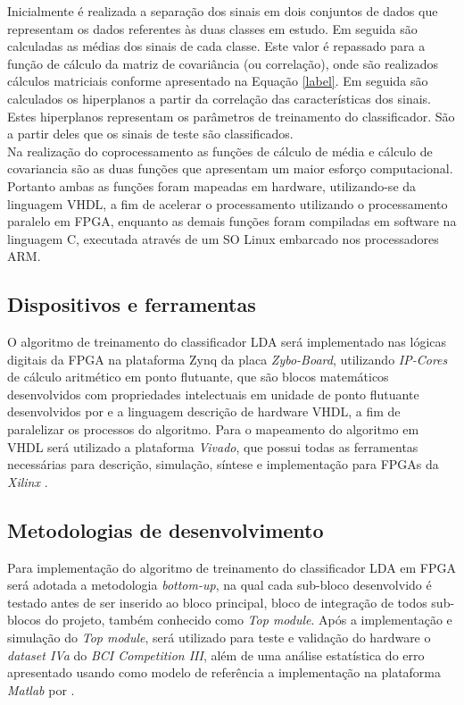 Inicialmente é realizada a separação dos sinais em dois conjuntos de dados que representam os dados referentes às duas classes em estudo. Em seguida são calculadas as médias dos sinais de cada classe. Este valor é repassado para a função de cálculo da matriz de covariância (ou correlação), onde são realizados cálculos matriciais conforme apresentado na Equação \ref{label}. Em seguida são calculados os hiperplanos a partir da correlação das características dos sinais. Estes hiperplanos representam os parâmetros de treinamento do classificador. São a partir deles que os sinais de teste são classificados.\\

Na realização do coprocessamento as funções de cálculo de média e cálculo de covariancia são as duas funções que apresentam um maior esforço computacional. Portanto ambas as funções foram mapeadas em hardware, utilizando-se da linguagem VHDL, a fim de acelerar o processamento utilizando o processamento paralelo em FPGA, enquanto as demais funções foram compiladas em software na linguagem C, executada através de um SO Linux embarcado nos processadores ARM.

\subsection{Dispositivos e ferramentas}
O algoritmo de treinamento do classificador LDA será implementado nas lógicas digitais da FPGA na plataforma Zynq da placa \textit{Zybo-Board}, utilizando \textit{IP-Cores} de cálculo aritmético em ponto flutuante, que são blocos matemáticos desenvolvidos com propriedades intelectuais \cite{munoz2010tradeoff} em unidade de ponto flutuante desenvolvidos por \cite{munoz2010tradeoff} e a linguagem descrição de hardware VHDL, a fim de paralelizar os processos do algoritmo. Para o mapeamento do algoritmo em VHDL será utilizado a plataforma \textit{Vivado}, que possui todas as ferramentas necessárias para descrição, simulação, síntese e implementação para FPGAs da \textit{Xilinx} \cite{zynqBook}.

\subsection{Metodologias de desenvolvimento}
Para implementação do algoritmo de treinamento do classificador LDA em FPGA será adotada a metodologia \textit{bottom-up}, na qual cada sub-bloco desenvolvido é testado antes de ser inserido ao bloco principal, bloco de integração de todos sub-blocos do projeto, também conhecido como \textit{Top module}.
Após a implementação e simulação do \textit{Top module}, será utilizado para teste e validação do hardware
 o \textit{dataset IVa} do \textit{BCI Competition III}, além de uma análise estatística do erro apresentado
usando como modelo de referência a implementação na plataforma \textit{Matlab} por \cite{F.Lotte}.

